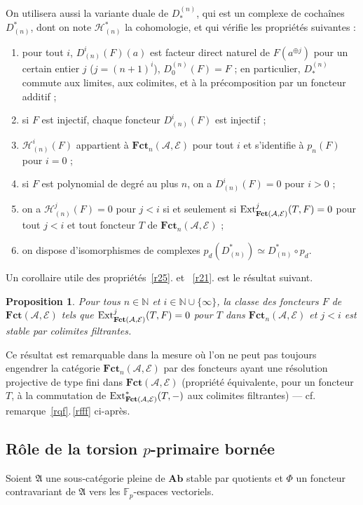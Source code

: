 \documentclass[a4paper,10pt]{article}
\newcommand{\A}{{\mathcal{A}}}
\newcommand{\fct}{\mathbf{Fct}}
\newcommand{\Hh}{{\mathcal{H}}}
\newcommand{\E}{{\mathcal{E}}}
\newcommand{\Pol}{\fct}
\newtheorem{pr}[thm]{Proposition}
\theoremstyle{definition}
\theoremstyle{remark}
\begin{document}
On utilisera aussi la variante duale de $D^{(n)}_*$, qui est un complexe de cochaînes $D_{(n)}^*$, dont on note $\Hh_{(n)}^*$ la cohomologie, et qui vérifie les propriétés suivantes :
\begin{enumerate}
 \item\label{r21} pour tout $i$, $D_{(n)}^i(F)(a)$ est facteur direct naturel de $F(a^{\oplus j})$ pour un certain entier $j$ ($j=(n+1)^i$), $D^{(n)}_0(F)=F$ ; en particulier, $D^{(n)}_*$ commute aux limites, aux colimites, et à la précomposition par un foncteur additif ;
\item si $F$ est injectif, chaque foncteur $D_{(n)}^i(F)$ est injectif ;
\item $\Hh_{(n)}^i(F)$ appartient à $\Pol_n(\A,\E)$ pour tout $i$ et s'identifie à $p_n(F)$ pour $i=0$ ;
\item si $F$ est polynomial de degré au plus $n$, on a $D_{(n)}^i(F)=0$ pour $i>0$ ;
\item\label{r25} on a $\Hh_{(n)}^j(F)=0$ pour $j<i$ si et seulement si  ${\rm Ext}^j_{\fct(\A,\E)}(T,F)=0$ pour tout $j<i$ et tout foncteur $T$ de $\Pol_n(\A,\E)$ ;
\item on dispose d'isomorphismes de complexes $p_d(D_{(n)}^*)\simeq D_{(n)}^*\circ p_d$.
\end{enumerate}


Un corollaire utile des propriétés~\ref{r25}. et ~\ref{r21}. est le résultat suivant.

\begin{pr}\label{pcol}
Pour tous $n\in\mathbb{N}$ et $i\in\mathbb{N}\cup\{\infty\}$, la classe des foncteurs $F$ de $\fct(\A,\E)$ tels que ${\rm Ext}^j_{\fct(\A,\E)}(T,F)=0$ pour $T$ dans $\Pol_n(\A,\E)$ et $j<i$ est stable par colimites filtrantes.
\end{pr}

Ce résultat est remarquable dans la mesure où l'on ne peut pas toujours engendrer la catégorie $\Pol_n(\A,\E)$ par des foncteurs ayant une résolution projective de type fini dans $\fct(\A,\E)$ (propriété équivalente, pour un foncteur $T$, à la commutation de ${\rm Ext}^*_{\fct(\A,\E)}(T,-)$ aux colimites filtrantes) --- cf. remarque~\ref{rqf}.\,\ref{rfff} ci-après.


\subsection{Rôle de la torsion $p$-primaire bornée}

Soient $\mathfrak{A}$ une sous-catégorie pleine de $\mathbf{Ab}$ stable par quotients et $\Phi$ un foncteur contravariant de $\mathfrak{A}$ vers les $\mathbb{F}_p$-espaces vectoriels.
\end{document}
